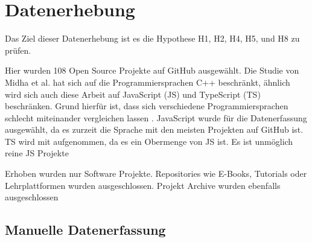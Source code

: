 \chapter{Datenerhebung} \label{kap:Datenerhebung}


Das Ziel dieser Datenerhebung ist es die Hypothese H1, H2, H4, H5, und H8 zu prüfen.




Hier wurden 108 Open Source Projekte auf GitHub ausgewählt.
Die Studie von Midha et al. hat sich auf die Programmiersprachen C++ beschränkt, ähnlich wird sich
auch diese Arbeit auf JavaScript (JS) und TypeScript (TS) beschränken. Grund hierfür ist, dass
sich verschiedene Programmiersprachen schlecht miteinander vergleichen lassen
\cite{midhaFactorsAffectingSuccess2012}.
JavaScript wurde für die Datenerfassung ausgewählt, da es zurzeit die Sprache mit den meisten
Projekten auf GitHub ist.
TS wird mit aufgenommen, da es ein Obermenge von JS ist. 
Es ist unmöglich reine JS Projekte 

Erhoben wurden nur Software Projekte. Repositories wie E-Books, Tutorials oder Lehrplattformen wurden 
ausgeschlossen. Projekt Archive wurden ebenfalls ausgeschlossen




\section{Manuelle Datenerfassung}\label{sec:manuelle_datenerfassung}

